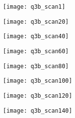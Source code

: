 		\begin{figure}[position = here]
			\begin{centering}
				\texttt{[image: q3b\_scan1]}\\
			\end{centering}
		\end{figure}
		\begin{figure}[position = here]
			\begin{centering}
				\texttt{[image: q3b\_scan20]}\\
			\end{centering}
		\end{figure}
		\begin{figure}[position = here]
			\begin{centering}
				\texttt{[image: q3b\_scan40]}\\
			\end{centering}
		\end{figure}
		\begin{figure}[position = here]
			\begin{centering}
				\texttt{[image: q3b\_scan60]}\\
			\end{centering}
		\end{figure}
		\begin{figure}[position = here]
			\begin{centering}
				\texttt{[image: q3b\_scan80]}\\
			\end{centering}
		\end{figure}
		\begin{figure}[position = here]
			\begin{centering}
				\texttt{[image: q3b\_scan100]}\\
			\end{centering}
		\end{figure}
		\begin{figure}[position = here]
			\begin{centering}
				\texttt{[image: q3b\_scan120]}\\
			\end{centering}
		\end{figure}
		\begin{figure}[position = here]
			\begin{centering}
				\texttt{[image: q3b\_scan140]}\\
			\end{centering}
		\end{figure}
